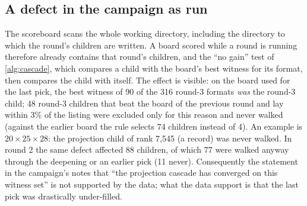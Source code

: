 \subsection{A defect in the campaign as run}\label{sec:selfref}
The scoreboard scans the whole working directory, including the directory to which the round's children are written. A board scored while a round is running therefore already contains that round's children, and the ``no gain'' test of \cref{alg:cascade}, which compares a child with the board's best witness for its format, then compares the child with itself.
The effect is visible: on the board used for the last pick, the best witness of 90 of the 316 round-3 formats \emph{was} the round-3 child; 48 round-3 children that beat the board of the previous round and lay within 3\% of the listing were excluded only for this reason and never walked (against the earlier board the rule selects 74 children instead of 4).
An example is $20\times25\times28$: the projection child of rank 7{,}545 (a record) was never walked. In round 2 the same defect affected 88 children, of which 77 were walked anyway through the deepening or an earlier pick (11 never).
Consequently the statement in the campaign's notes that ``the projection cascade has converged on this witness set'' is not supported by the data; what the data support is that the last pick was drastically under-filled.
